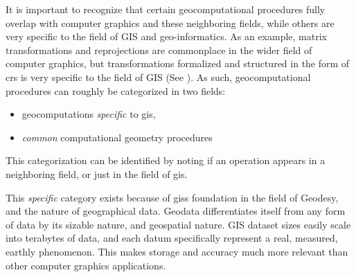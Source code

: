 It is important to recognize that certain geocomputational procedures fully overlap with computer graphics and these neighboring fields, while others are very specific to the field of GIS and geo-informatics.
As an example, matrix transformations and reprojections are commonplace in the wider field of computer graphics, but transformations formalized and structured in the form of \ac*{crs} is very specific to the field of GIS (See ).
As such, geocomputational procedures can roughly be categorized in two fields: 
\begin{itemize}[-]
  \item geocomputations \emph{specific} to \ac{gis},
  \item \emph{common} computational geometry procedures
\end{itemize}
This categorization can be identified by noting if an operation appears in a neighboring field, or just in the field of \ac{gis}.

This \emph{specific} category exists because of \ac{gis}s foundation in the field of Geodesy, and the nature of geographical data. 
Geodata differentiates itself from any form of data by its sizable nature, and geospatial nature. 
GIS dataset sizes easily scale into terabytes of data, and each datum specifically represent a real, measured, earthly phenomenon.
This makes storage and accuracy much more relevant than other computer graphics applications. 





